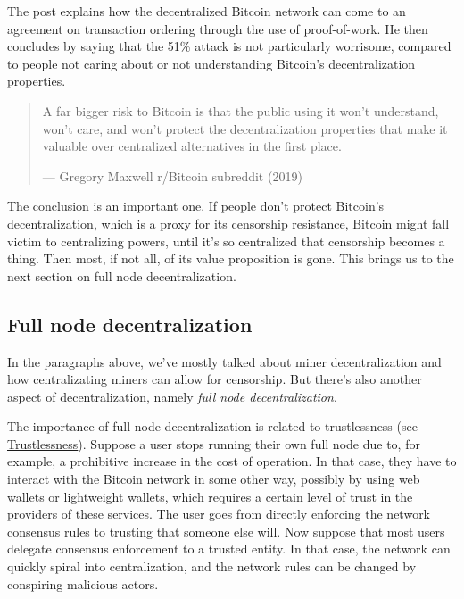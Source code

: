 The post explains how the decentralized Bitcoin network can come to an
agreement on transaction ordering through the use of proof-of-work. He
then concludes by saying that the 51\% attack is not particularly
worrisome, compared to people not caring about or not understanding
Bitcoin's decentralization properties.

\begin{quote}
A far bigger risk to Bitcoin is that the public using it won't
understand, won't care, and won't protect the decentralization
properties that make it valuable over centralized alternatives in the
first place.

---  Gregory Maxwell r/Bitcoin subreddit (2019)
\end{quote}

The conclusion is an important one. If people don't protect Bitcoin's
decentralization, which is a proxy for its censorship resistance,
Bitcoin might fall victim to centralizing powers, until it's so
centralized that censorship becomes a thing. Then most, if not all, of
its value proposition is gone. This brings us to the next section on
full node decentralization.

\hypertarget{fullnodedecentralization}{%
\subsection{Full node decentralization}\label{fullnodedecentralization}}

In the paragraphs above, we've mostly talked about miner
decentralization and how centralizating miners can allow for censorship.
But there's also another aspect of decentralization, namely \emph{full
node decentralization}.

The importance of full node decentralization is related to trustlessness
(see \protect\hyperlink{trustlessness}{Trustlessness}). Suppose a user
stops running their own full node due to, for example, a prohibitive
increase in the cost of operation. In that case, they have to interact
with the Bitcoin network in some other way, possibly by using web
wallets or lightweight wallets, which requires a certain level of trust
in the providers of these services. The user goes from directly
enforcing the network consensus rules to trusting that someone else
will. Now suppose that most users delegate consensus enforcement to a
trusted entity. In that case, the network can quickly spiral into
centralization, and the network rules can be changed by conspiring
malicious actors.


